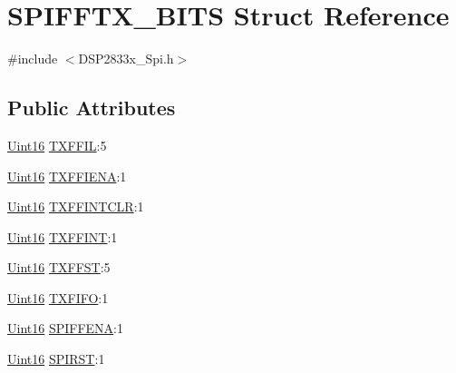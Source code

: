 \hypertarget{struct_s_p_i_f_f_t_x___b_i_t_s}{}\section{S\+P\+I\+F\+F\+T\+X\+\_\+\+B\+I\+T\+S Struct Reference}
\label{struct_s_p_i_f_f_t_x___b_i_t_s}


{\ttfamily \#include $<$D\+S\+P2833x\+\_\+\+Spi.\+h$>$}

\subsection*{Public Attributes}
\begin{DoxyCompactItemize}
\item 
\hyperlink{_d_s_p2833x___device_8h_a59a9f6be4562c327cbfb4f7e8e18f08b}{Uint16} \hyperlink{struct_s_p_i_f_f_t_x___b_i_t_s_abc50d5ff12d90c13f5d60fc7024c2af4}{T\+X\+F\+F\+I\+L}\+:5
\item 
\hyperlink{_d_s_p2833x___device_8h_a59a9f6be4562c327cbfb4f7e8e18f08b}{Uint16} \hyperlink{struct_s_p_i_f_f_t_x___b_i_t_s_a0be2e7dea5ad4deb8e581af14773d609}{T\+X\+F\+F\+I\+E\+N\+A}\+:1
\item 
\hyperlink{_d_s_p2833x___device_8h_a59a9f6be4562c327cbfb4f7e8e18f08b}{Uint16} \hyperlink{struct_s_p_i_f_f_t_x___b_i_t_s_a36e6e0fd0882fb305a8c6b8adf8ca494}{T\+X\+F\+F\+I\+N\+T\+C\+L\+R}\+:1
\item 
\hyperlink{_d_s_p2833x___device_8h_a59a9f6be4562c327cbfb4f7e8e18f08b}{Uint16} \hyperlink{struct_s_p_i_f_f_t_x___b_i_t_s_acaf976cc97ef75c45dc5e49bc4ba6b82}{T\+X\+F\+F\+I\+N\+T}\+:1
\item 
\hyperlink{_d_s_p2833x___device_8h_a59a9f6be4562c327cbfb4f7e8e18f08b}{Uint16} \hyperlink{struct_s_p_i_f_f_t_x___b_i_t_s_aecfdfb7be63ecf80df3a50f8c4b2cbeb}{T\+X\+F\+F\+S\+T}\+:5
\item 
\hyperlink{_d_s_p2833x___device_8h_a59a9f6be4562c327cbfb4f7e8e18f08b}{Uint16} \hyperlink{struct_s_p_i_f_f_t_x___b_i_t_s_a3675cd8f14d266baa90e2ea1769cb202}{T\+X\+F\+I\+F\+O}\+:1
\item 
\hyperlink{_d_s_p2833x___device_8h_a59a9f6be4562c327cbfb4f7e8e18f08b}{Uint16} \hyperlink{struct_s_p_i_f_f_t_x___b_i_t_s_a78a644b846c244c8292d60d130d7aff6}{S\+P\+I\+F\+F\+E\+N\+A}\+:1
\item 
\hyperlink{_d_s_p2833x___device_8h_a59a9f6be4562c327cbfb4f7e8e18f08b}{Uint16} \hyperlink{struct_s_p_i_f_f_t_x___b_i_t_s_a0f205b6858d117946d6a6c913cd4f5cd}{S\+P\+I\+R\+S\+T}\+:1
\end{DoxyCompactItemize}


